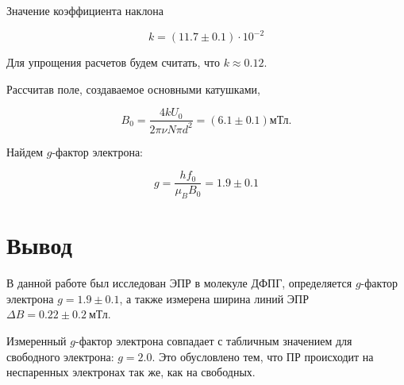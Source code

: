     Значение коэффициента наклона 

    \[ k = (11.7 \pm 0.1) \cdot 10^{-2} \]

    Для упрощения расчетов будем считать, что $k \approx 0.12$.


    Рассчитав поле, создаваемое основными катушками,
    
    \begin{equation*}
        B_0 = \frac{4 k U_0}{2\pi\nu N \pi d^2} = (6.1 \pm 0.1) \text{мТл}.
    \end{equation*}
    
    Найдем $g$-фактор электрона:
    
    \begin{equation*}
        g = \frac{hf_0}{\mu_BB_0} = 1.9 \pm 0.1
    \end{equation*}
    

    \section*{Вывод}
	
    В данной работе был исследован ЭПР в молекуле ДФПГ, определяется $g$-фактор электрона $g = 1.9 \pm 0.1$, а также измерена ширина линий ЭПР $\Delta B = 0.22 \pm 0.2~\text{мТл}$. 
	
    Измеренный $g$-фактор электрона совпадает с табличным значением для свободного электрона: $g = 2.0$. Это обусловлено тем, что ПР происходит на неспаренных электронах так же, как на свободных.
	


